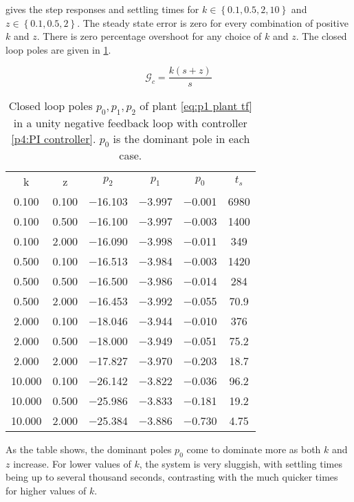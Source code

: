 \problem

 gives the step responses and settling times for $k\in\left\{0.1,0.5,2,10\right\}$ and $z\in\left\{0.1,0.5,2\right\}$. The steady state error is zero for every combination of positive $k$ and $z$. There is zero percentage overshoot for any choice of $k$ and $z$. The closed loop poles are given in \cref{tab:p4 cl poles}.

\begin{equation}
	\label{p4:PI controller}
	\mathcal{G}_c = \frac{k(s+z)}{s}
\end{equation}


\begin{table}[h]
	\centering
	\begin{tabular}{cccccc}
		\toprule
		k & z & $p_2$ & $p_1$ & $p_0$ & $t_s$\\
		\cmidrule(r){1-1}\cmidrule(lr){2-2}\cmidrule(lr){3-5}\cmidrule(l){6-6}
		\num{0.100} & \num{0.100} & \num{-16.103} & \num{-3.997} & \num{-0.001}&6980\\
		\num{0.100} & \num{0.500} & \num{-16.100} & \num{-3.997} & \num{-0.003}&1400\\
		\num{0.100} & \num{2.000} & \num{-16.090} & \num{-3.998} & \num{-0.011}&349\\
		\num{0.500} & \num{0.100} & \num{-16.513} & \num{-3.984} & \num{-0.003}&1420\\
		\num{0.500} & \num{0.500} & \num{-16.500} & \num{-3.986} & \num{-0.014}&284\\
		\num{0.500} & \num{2.000} & \num{-16.453} & \num{-3.992} & \num{-0.055}&70.9\\
		\num{2.000} & \num{0.100} & \num{-18.046} & \num{-3.944} & \num{-0.010}&376\\
		\num{2.000} & \num{0.500} & \num{-18.000} & \num{-3.949} & \num{-0.051}&75.2\\
		\num{2.000} & \num{2.000} & \num{-17.827} & \num{-3.970} & \num{-0.203}&18.7\\
		\num{10.000} & \num{0.100} & \num{-26.142} & \num{-3.822} & \num{-0.036}&96.2\\
		\num{10.000} & \num{0.500} & \num{-25.986} & \num{-3.833} & \num{-0.181}&19.2\\
		\num{10.000} & \num{2.000} & \num{-25.384} & \num{-3.886} & \num{-0.730}&4.75\\
		\bottomrule
	\end{tabular}
	\caption{Closed loop poles $p_0, p_1, p_2$ of plant \cref{eq:p1 plant tf} in a unity negative feedback loop with controller \cref{p4:PI controller}. $p_0$ is the dominant pole in each case.}
	\label{tab:p4 cl poles}
\end{table}

As the table shows, the dominant poles $p_0$ come to dominate more as both $k$ and $z$ increase. For lower values of $k$, the system is very sluggish, with settling times being up to several thousand seconds, contrasting with the much quicker times for higher values of $k$.